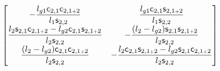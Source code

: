 \documentclass[a4paper,11pt,brazil,fleqn]{article}
\begin{document}
\begin{itemize}
\begin{equation}
\begin{bmatrix}
-\displaystyle\frac{l_{g1} \mathsf{c}_{2,1} \mathsf{c}_{2,1{\scriptscriptstyle +} 2}}{l_1 \mathsf{s}_{2,2}} & \displaystyle\frac{l_{g1} \mathsf{c}_{2,1} \mathsf{s}_{2,1{\scriptscriptstyle +} 2}}{l_1 \mathsf{s}_{2,2}} \\
\displaystyle\frac{l_2 \mathsf{s}_{2,1}\mathsf{c}_{2,1{\scriptscriptstyle +} 2} - l_{g2} \mathsf{c}_{2,1} \mathsf{s}_{2,1{\scriptscriptstyle +} 2} }{l_2 \mathsf{s}_{2,2}} & -\displaystyle\frac{(l_2 - l_{g2}) \mathsf{s}_{2,1}\mathsf{s}_{2,1{\scriptscriptstyle +} 2} }{l_2 \mathsf{s}_{2,2}} \\
\displaystyle\frac{(l_2 - l_{g2}) \mathsf{c}_{2,1}\mathsf{c}_{2,1{\scriptscriptstyle +} 2} }{l_2 \mathsf{s}_{2,2}} & -\displaystyle\frac{l_2 \mathsf{c}_{2,1}\mathsf{s}_{2,1{\scriptscriptstyle +} 2} - l_{g2} \mathsf{s}_{2,1} \mathsf{c}_{2,1{\scriptscriptstyle +} 2} }{l_2 \mathsf{s}_{2,2}} \\
\end{bmatrix}
\end{equation}\normalsize

\end{itemize}
\end{document}
